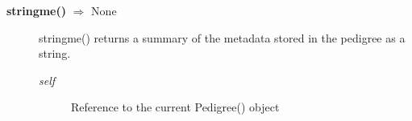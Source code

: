 \begin{description}
\item[\textbf{stringme()} $\Rightarrow$ None]
stringme() returns a summary of the metadata stored in the pedigree as a string.
\begin{description}
\item[\emph{self}] Reference to the current Pedigree() object
\end{description}

\end{description}